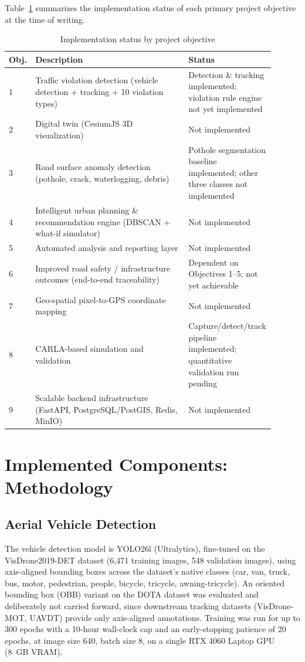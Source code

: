 \documentclass[conference]{IEEEtran}
\begin{document}
Table~\ref{tab:status} summarizes the implementation status of each primary project objective at the time of writing.

\begin{table}[htbp]
\caption{Implementation status by project objective}
\label{tab:status}
\centering
\begin{tabular}{@{}p{0.09\linewidth}p{0.58\linewidth}p{0.23\linewidth}@{}}
\toprule
\textbf{Obj.} & \textbf{Description} & \textbf{Status} \\
\midrule
1 & Traffic violation detection (vehicle detection + tracking + 10 violation types) & Detection \& tracking implemented; violation rule engine not yet implemented \\
2 & Digital twin (CesiumJS 3D visualization) & Not implemented \\
3 & Road surface anomaly detection (pothole, crack, waterlogging, debris) & Pothole segmentation baseline implemented; other three classes not implemented \\
4 & Intelligent urban planning \& recommendation engine (DBSCAN + what-if simulator) & Not implemented \\
5 & Automated analysis and reporting layer & Not implemented \\
6 & Improved road safety / infrastructure outcomes (end-to-end traceability) & Dependent on Objectives 1--5; not yet achievable \\
7 & Geo-spatial pixel-to-GPS coordinate mapping & Not implemented \\
8 & CARLA-based simulation and validation & Capture/detect/track pipeline implemented; quantitative validation run pending \\
9 & Scalable backend infrastructure (FastAPI, PostgreSQL/PostGIS, Redis, MinIO) & Not implemented \\
\bottomrule
\end{tabular}
\end{table}

\section{Implemented Components: Methodology}

\subsection{Aerial Vehicle Detection}

The vehicle detection model is YOLO26l (Ultralytics), fine-tuned on the VisDrone2019-DET dataset (6{,}471 training images, 548 validation images), using axis-aligned bounding boxes across the dataset's native classes (car, van, truck, bus, motor, pedestrian, people, bicycle, tricycle, awning-tricycle). An oriented bounding box (OBB) variant on the DOTA dataset was evaluated and deliberately not carried forward, since downstream tracking datasets (VisDrone-MOT, UAVDT) provide only axis-aligned annotations. Training was run for up to 300 epochs with a 10-hour wall-clock cap and an early-stopping patience of 20 epochs, at image size 640, batch size 8, on a single RTX 4060 Laptop GPU (8~GB VRAM).
\end{document}
